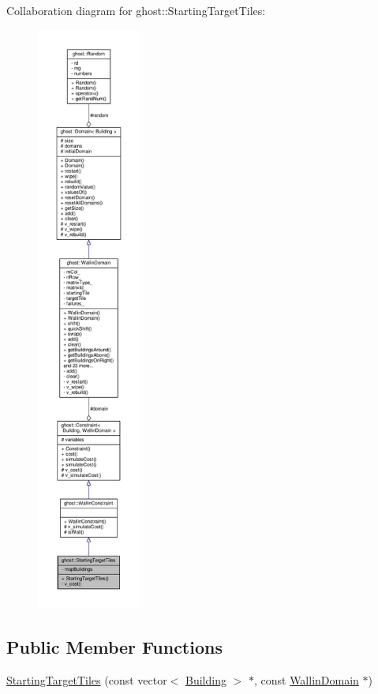 Collaboration diagram for ghost\-:\-:Starting\-Target\-Tiles\-:
\nopagebreak
\begin{figure}[H]
\begin{center}
\leavevmode
\includegraphics[height=550pt]{classghost_1_1StartingTargetTiles__coll__graph}
\end{center}
\end{figure}
\subsection*{Public Member Functions}
\begin{DoxyCompactItemize}
\item 
\hyperlink{classghost_1_1StartingTargetTiles_a6c2b6cf28fb668cfe7909396679d2587}{Starting\-Target\-Tiles} (const vector$<$ \hyperlink{classghost_1_1Building}{Building} $>$ $\ast$, const \hyperlink{classghost_1_1WallinDomain}{Wallin\-Domain} $\ast$)
\end{DoxyCompactItemize}
